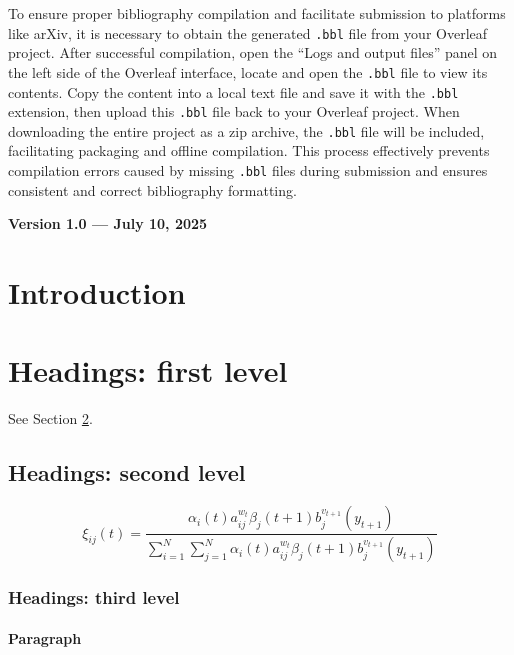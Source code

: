 \documentclass[twocolumn, switch]{article} %
\begin{document}
To ensure proper bibliography compilation and facilitate submission to platforms like arXiv, it is necessary to obtain the generated \texttt{.bbl} file from your Overleaf project. After successful compilation, open the “Logs and output files” panel on the left side of the Overleaf interface, locate and open the \texttt{.bbl} file to view its contents. Copy the content into a local text file and save it with the \texttt{.bbl} extension, then upload this \texttt{.bbl} file back to your Overleaf project. When downloading the entire project as a zip archive, the \texttt{.bbl} file will be included, facilitating packaging and offline compilation. This process effectively prevents compilation errors caused by missing \texttt{.bbl} files during submission and ensures consistent and correct bibliography formatting.

\vspace{1em}
\noindent\textbf{Version 1.0 --- July 10, 2025}

\section{Introduction}
\lipsum[2]

\lipsum[3]


\section{Headings: first level}
\label{sec:headings}

\lipsum[7] See Section \ref{sec:headings}.

\subsection{Headings: second level}
\lipsum[5]
\begin{equation}
\xi _{ij}(t)= {\frac {\alpha _{i}(t)a^{w_t}_{ij}\beta _{j}(t+1)b^{v_{t+1}}_{j}(y_{t+1})}{\sum _{i=1}^{N} \sum _{j=1}^{N} \alpha _{i}(t)a^{w_t}_{ij}\beta _{j}(t+1)b^{v_{t+1}}_{j}(y_{t+1})}}
\end{equation}

\subsubsection{Headings: third level}
\lipsum[6]

\paragraph{Paragraph}
\lipsum[7]
\end{document}
